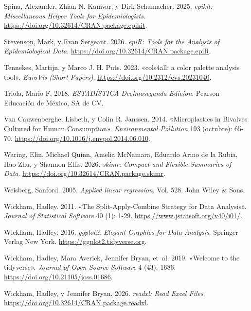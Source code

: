 \documentclass[
  spanish,
  a4paper,
]{scrbook}
\newlength{\cslhangindent}
\newenvironment{CSLReferences}[2] %
 {\begin{list}{}{%
  \setlength{\itemindent}{0pt}
  \setlength{\leftmargin}{0pt}
  \setlength{\parsep}{0pt}
  \ifodd #1
   \setlength{\leftmargin}{\cslhangindent}
   \setlength{\itemindent}{-1\cslhangindent}
  \fi
  \setlength{\itemsep}{#2\baselineskip}}}
 {\end{list}}
\begin{document}
\begin{CSLReferences}{1}{1}
Spina, Alexander, Zhian N. Kamvar, y Dirk Schumacher. 2025.
\emph{epikit: Miscellaneous Helper Tools for Epidemiologists}.
\url{https://doi.org/10.32614/CRAN.package.epikit}.

Stevenson, Mark, y Evan Sergeant. 2026. \emph{epiR: Tools for the
Analysis of Epidemiological Data}.
\url{https://doi.org/10.32614/CRAN.package.epiR}.

Tennekes, Martijn, y Marco J. H. Puts. 2023. {«{cols4all}: a color
palette analysis tool»}. \emph{EuroVis (Short Papers)}.
\url{https://doi.org/10.2312/evs.20231040}.

Triola, Mario F. 2018. \emph{{ESTADÍSTICA} {Decimosegunda} {Edicion}}.
Pearson Educación de México, SA de CV.

Van Cauwenberghe, Lisbeth, y Colin R. Janssen. 2014. {«Microplastics in
Bivalves Cultured for Human Consumption»}. \emph{Environmental
Pollution} 193 (octubre): 65-70.
\url{https://doi.org/10.1016/j.envpol.2014.06.010}.

Waring, Elin, Michael Quinn, Amelia McNamara, Eduardo Arino de la Rubia,
Hao Zhu, y Shannon Ellis. 2026. \emph{skimr: Compact and Flexible
Summaries of Data}. \url{https://doi.org/10.32614/CRAN.package.skimr}.

Weisberg, Sanford. 2005. \emph{Applied linear regression}. Vol. 528.
John Wiley \& Sons.

Wickham, Hadley. 2011. {«The Split-Apply-Combine Strategy for Data
Analysis»}. \emph{Journal of Statistical Software} 40 (1): 1-29.
\url{https://www.jstatsoft.org/v40/i01/}.

Wickham, Hadley. 2016. \emph{ggplot2: Elegant Graphics for Data
Analysis}. Springer-Verlag New York.
\url{https://ggplot2.tidyverse.org}.

Wickham, Hadley, Mara Averick, Jennifer Bryan, et~al. 2019. {«Welcome to
the {tidyverse}»}. \emph{Journal of Open Source Software} 4 (43): 1686.
\url{https://doi.org/10.21105/joss.01686}.

Wickham, Hadley, y Jennifer Bryan. 2026. \emph{readxl: Read Excel
Files}. \url{https://doi.org/10.32614/CRAN.package.readxl}.


\end{CSLReferences}
\end{document}
